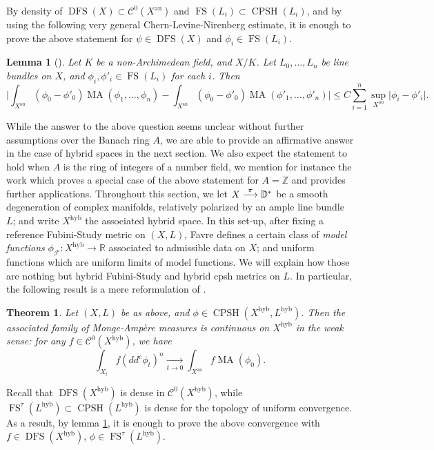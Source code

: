 \documentclass[JEP,XML,SOM,Unicode,published]{cedram}
\newcommand{\To}[1]{\mathchoice{\xrightarrow{\textstyle\kern4pt#1\kern3pt}}{\stackrel{#1}{\longrightarrow}}{}{}}
\newtheorem{theo}[equation]{Theorem}
\newtheorem{lem}[equation]{Lemma}
\theoremstyle{definition}
\newcommand \D {\mathbb{D}}
\newcommand \R{\mathbb R}
\newcommand \Z{\mathbb Z}
\newcommand{\an}{\mathrm{an}}
\DeclareMathOperator{\CPSH}{CPSH}
\DeclareMathOperator{\DFS}{DFS}
\DeclareMathOperator{\FS}{FS}
\newcommand{\hyb}{\mathrm{hyb}}
\DeclareMathOperator{\MA}{MA}
\begin{document}
By density of $\DFS(X) \subset \mathcal{C}^0(X^{\an})$ and $\FS(L_i) \subset \CPSH(L_i)$, and by using the following very general Chern-Levine-Nirenberg estimate, it is enough to prove the above statement for $\psi \in \DFS(X)$ and $\phi_i \in \FS(L_i)$.
\begin{lem}[{\cite[Lem.\,8.6]{BE}}] \label{lem CLN}Let $K$ be a non-Archimedean field, and $X/K$.
Let $L_0,\dots,L_n$ be line bundles on $X$, and $\phi_i, \phi'_i \in \FS(L_i)$ for each $i$. Then
\[
\biggl\lvert \int_{X^{\an}} (\phi_0-\phi'_0) \MA(\phi_1,\dots,\phi_n) - \int_{X^{\an}} (\phi_0-\phi'_0) \MA(\phi'_1,\dots,\phi'_n) \biggr\rvert \le C \sum_{i=1}^n \sup_{X^{\an}} \lvert \phi_i - \phi'_i \rvert.
\]
\end{lem}
While the answer to the above question seems unclear without further assumptions over the Banach ring $A$, we are able to provide an affirmative answer in the case of hybrid spaces in the next section. We also expect the statement to hold when $A$ is the ring of integers of a number field, we mention for instance the work \cite{PoiDyn} which proves a special case of the above statement for $A= \Z$ and provides further applications.
Throughout this section, we let $X \To{\pi} \D^*$ be a smooth degeneration of complex manifolds, relatively polarized by an ample line bundle $L$; and write $X^{\hyb}$ the associated hybrid space. In this set-up, after fixing a reference Fubini-Study metric on $(X,L)$, Favre \cite{Fav} defines a certain class of \emph{model functions} $\phi_{\mathcal{F}}: X^{\hyb} \to \R$ associated to admissible data on $X$; and uniform functions which are uniform limits of model functions. We will explain how those are nothing but hybrid Fubini-Study and hybrid cpsh metrics on $L$. In particular, the following result is a mere reformulation of \cite[Th.\,4.2]{Fav}.
\begin{theo} \label{theo cont MA}
Let $(X,L)$ be as above, and $\phi \in \CPSH(X^{\hyb}, L^{\hyb})$. Then the associated family of Monge-Ampère measures is continuous on $X^{\hyb}$ in the weak sense: for any $f \in \mathcal{C}^0(X^{\hyb})$, we have
\[
\int_{X_t} f (dd^c \phi_t)^n \xrightarrow[t \to 0]{} \int_{X^{\an}} f \MA(\phi_0).
\]
\end{theo}
Recall that $\DFS(X^{\hyb})$ is dense in $\mathcal{C}^0(X^{\hyb})$, while $\FS^{\tau}(L^{\hyb}) \subset \CPSH(L^{\hyb})$ is dense for the topology of uniform convergence. As a result, by lemma \ref{lem CLN}, it is enough to prove the above convergence with $f \in \DFS(X^{\hyb})$, $\phi \in \FS^{\tau}(L^{\hyb})$.
\end{document}
